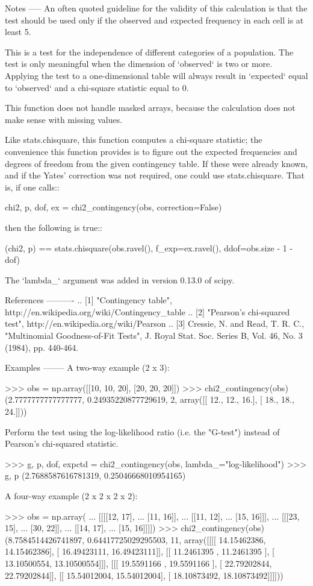 \begin{DoxyVerb}
Notes
-----
An often quoted guideline for the validity of this calculation is that
the test should be used only if the observed and expected frequency in
each cell is at least 5.

This is a test for the independence of different categories of a
population. The test is only meaningful when the dimension of
`observed` is two or more.  Applying the test to a one-dimensional
table will always result in `expected` equal to `observed` and a
chi-square statistic equal to 0.

This function does not handle masked arrays, because the calculation
does not make sense with missing values.

Like stats.chisquare, this function computes a chi-square statistic;
the convenience this function provides is to figure out the expected
frequencies and degrees of freedom from the given contingency table.
If these were already known, and if the Yates' correction was not
required, one could use stats.chisquare.  That is, if one calls::

    chi2, p, dof, ex = chi2_contingency(obs, correction=False)

then the following is true::

    (chi2, p) == stats.chisquare(obs.ravel(), f_exp=ex.ravel(),
                                 ddof=obs.size - 1 - dof)

The `lambda_` argument was added in version 0.13.0 of scipy.

References
----------
.. [1] "Contingency table", http://en.wikipedia.org/wiki/Contingency_table
.. [2] "Pearson's chi-squared test",
       http://en.wikipedia.org/wiki/Pearson%
.. [3] Cressie, N. and Read, T. R. C., "Multinomial Goodness-of-Fit
       Tests", J. Royal Stat. Soc. Series B, Vol. 46, No. 3 (1984),
       pp. 440-464.

Examples
--------
A two-way example (2 x 3):

>>> obs = np.array([[10, 10, 20], [20, 20, 20]])
>>> chi2_contingency(obs)
(2.7777777777777777,
 0.24935220877729619,
 2,
 array([[ 12.,  12.,  16.],
        [ 18.,  18.,  24.]]))

Perform the test using the log-likelihood ratio (i.e. the "G-test")
instead of Pearson's chi-squared statistic.

>>> g, p, dof, expctd = chi2_contingency(obs, lambda_="log-likelihood")
>>> g, p
(2.7688587616781319, 0.25046668010954165)

A four-way example (2 x 2 x 2 x 2):

>>> obs = np.array(
...     [[[[12, 17],
...        [11, 16]],
...       [[11, 12],
...        [15, 16]]],
...      [[[23, 15],
...        [30, 22]],
...       [[14, 17],
...        [15, 16]]]])
>>> chi2_contingency(obs)
(8.7584514426741897,
 0.64417725029295503,
 11,
 array([[[[ 14.15462386,  14.15462386],
          [ 16.49423111,  16.49423111]],
         [[ 11.2461395 ,  11.2461395 ],
          [ 13.10500554,  13.10500554]]],
        [[[ 19.5591166 ,  19.5591166 ],
          [ 22.79202844,  22.79202844]],
         [[ 15.54012004,  15.54012004],
          [ 18.10873492,  18.10873492]]]]))
\end{DoxyVerb}
